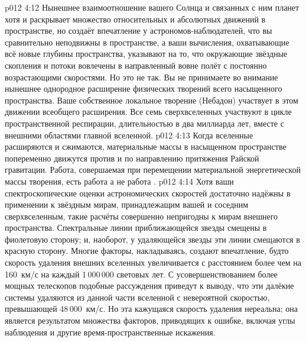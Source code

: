 \vs p012 4:12 \pc Нынешнее взаимоотношение вашего Солнца и связанных с ним планет хотя и раскрывает множество относительных и абсолютных движений в пространстве, но создаёт впечатление у астрономов\hyp{}наблюдателей, что вы сравнительно неподвижны в пространстве, а ваши вычисления, охватывающие всё новые глубины пространства, указывают на то, что окружающие звёздные скопления и потоки вовлечены в направленный вовне полёт с постоянно возрастающими скоростями. Но это не так. Вы не принимаете во внимание нынешнее однородное расширение физических творений всего насыщенного пространства. Ваше собственное локальное творение (Небадон) участвует в этом движении всеобщего расширения. Все семь сверхвселенных участвуют в цикле пространственной респирации, длительностью в два миллиарда лет, вместе с внешними областями главной вселенной.
\vs p012 4:13 Когда вселенные расширяются и сжимаются, материальные массы в насыщенном пространстве попеременно движутся против и по направлению притяжения Райской гравитации. Работа, совершаемая при перемещении материальной энергетической массы творения, есть работа  а не работа .
\vs p012 4:14 \pc Хотя ваши спектроскопические оценки астрономических скоростей достаточно надёжны в применении к звёздным мирам, принадлежащим вашей и соседним сверхвселенным, такие расчёты совершенно непригодны к мирам внешнего пространства. Спектральные линии приближающейся звезды смещены в фиолетовую сторону; и, наоборот, у удаляющейся звезды эти линии смещаются в красную сторону. Многие факторы, накладываясь, создают впечатление, будто скорость удаления внешних вселенных увеличивается с расстоянием более чем на 160~км/с на каждый 1\,000\,000 световых лет. С усовершенствованием более мощных телескопов подобные рассуждения приведут к выводу, что эти далёкие системы удаляются из данной части вселенной с невероятной скоростью, превышающей 48\,000~км/с. Но эта кажущаяся скорость удаления нереальна; она является результатом множества факторов, приводящих к ошибке, включая углы наблюдения и другие время\hyp{}пространственные искажения.
